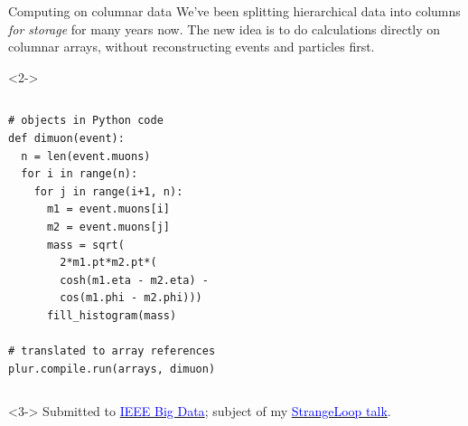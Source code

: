 \documentclass{beamer}
\begin{document}
\begin{frame}[fragile]{Computing on columnar data}
\vspace{0.5 cm}
We've been splitting hierarchical data into columns {\it for storage} for many years now. The new idea is to do calculations directly on columnar arrays, without reconstructing events and particles first.

\begin{uncoverenv}<2->
\vspace{0.35 cm}
\begin{columns}[b]
\scriptsize
\begin{verbatim}
# objects in Python code
def dimuon(event):
  n = len(event.muons)
  for i in range(n):
    for j in range(i+1, n):
      m1 = event.muons[i]
      m2 = event.muons[j]
      mass = sqrt(
        2*m1.pt*m2.pt*(
        cosh(m1.eta - m2.eta) -
        cos(m1.phi - m2.phi)))
      fill_histogram(mass)

# translated to array references
plur.compile.run(arrays, dimuon)
\end{verbatim}

\end{columns}
\end{uncoverenv}

\vspace{0.35 cm}
\begin{uncoverenv}<3->
Submitted to \href{http://cci.drexel.edu/bigdata/bigdata2017/index.html}{\textcolor{blue}{IEEE Big Data}}; subject of my \href{https://thestrangeloop.com/2017/particle-physics-10-000-times-faster.html}{\textcolor{blue}{StrangeLoop talk}}.
\end{uncoverenv}
\end{frame}
\end{document}
